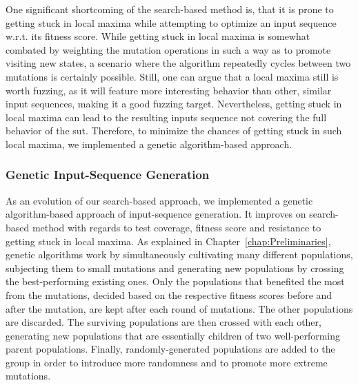 One significant shortcoming of the search-based method is, that it is prone to getting stuck in local maxima while attempting to optimize an input sequence w.r.t. its fitness score. While getting stuck in local maxima is somewhat combated by weighting the mutation operations in such a way as to promote visiting new states, a scenario where the algorithm repeatedly cycles between two mutations is certainly possible. Still, one can argue that a local maxima still is worth fuzzing, as it will feature more interesting behavior than other, similar input sequences, making it a good fuzzing target. Nevertheless, getting stuck in local maxima can lead to the resulting inputs sequence not covering the full behavior of the \ac{sut}. Therefore, to minimize the chances of getting stuck in such local maxima, we implemented a genetic algorithm-based approach. \\

\subsubsection{Genetic Input-Sequence Generation} \label{subsubsec:genetic}
As an evolution of our search-based approach, we implemented a genetic algorithm-based approach of input-sequence generation. It improves on search-based method with regards to test coverage, fitness score and resistance to getting stuck in local maxima. As explained in Chapter~\ref{chap:Preliminaries}, genetic algorithms work by simultaneously cultivating many different populations, subjecting them to small mutations and generating new populations by crossing the best-performing existing ones. Only the populations that benefited the most from the mutations, decided based on the respective fitness scores before and after the mutation, are kept after each round of mutations. The other populations are discarded. The surviving populations are then crossed with each other, generating new populations that are essentially children of two well-performing parent populations. Finally, randomly-generated populations are added to the group in order to introduce more randomness and to promote more extreme mutations. 

